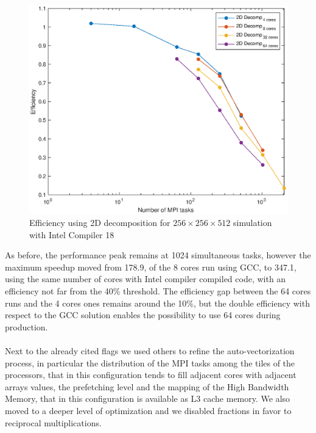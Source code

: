 \begin{figure}
\begin{center}
\includegraphics[scale=0.55]{grafici/intel_efficiency}
\caption{Efficiency using 2D decomposition for $256\times 256\times 512$ simulation with Intel Compiler 18}
\label{intel:efficiency}
\end{center}
\end{figure}

As before, the performance peak remains at 1024 simultaneous tasks, however the maximum speedup moved from 178.9, of the 8 cores run using GCC, to 347.1, using the same number of cores with Intel compiler compiled code, with an efficiency not far from the 40\% threshold.
The efficiency gap between the 64 cores runs and the 4 cores ones remains around the 10\%, but the double efficiency with respect to the GCC solution enables the possibility to use 64 cores during production.\\~\\

Next to the already cited flags we used others to refine the auto-vectorization process, in particular the distribution of the MPI tasks among the tiles of the processors, that in this configuration tends to fill adjacent cores with adjacent arrays values, the prefetching level and the mapping of the High Bandwidth Memory, that in this configuration is available as L3 cache memory.
We also moved to a deeper level of optimization and we disabled fractions in favor to reciprocal multiplications.


